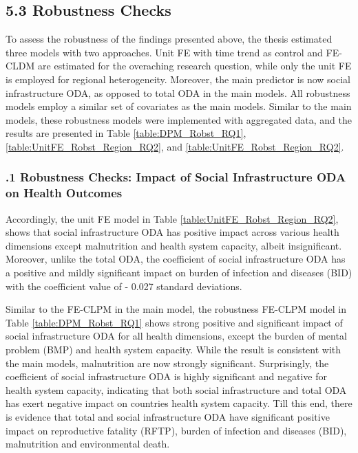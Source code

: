 \subsection*{5.3 Robustness Checks}
To assess the robustness of the findings presented above, the thesis estimated three models with two approaches. Unit FE with time trend as control and FE-CLDM are estimated for the overaching research question, while only the unit FE is employed for regional heterogeneity. Moreover, the main predictor is now social infrastructure ODA, as opposed to total ODA in the main models. All robustness models employ a similar set of covariates as the main models. Similar to the main models, these robustness models were implemented with aggregated data, and the results are presented in Table \ref{table:DPM_Robst_RQ1}, \ref{table:UnitFE_Robst_Region_RQ2}, and \ref{table:UnitFE_Robst_Region_RQ2}.
\subsubsection*{.1 Robustness Checks: Impact of Social Infrastructure ODA on Health Outcomes}


Accordingly, the unit FE model in Table \ref{table:UnitFE_Robst_Region_RQ2}, shows that social infrastructure ODA has positive impact across various health dimensions except malnutrition and health system capacity, albeit insignificant. Moreover, unlike the total ODA, the coefficient of social infrastructure ODA has a positive and mildly significant impact on burden of infection and diseases (BID) with the coefficient value of - 0.027 standard deviations. 


Similar to the FE-CLPM in the main model, the robustness FE-CLPM model  in Table \ref{table:DPM_Robst_RQ1} shows strong positive and significant impact of social infrastructure ODA for all health dimensions, except the burden of mental problem (BMP) and health system capacity. While the result is consistent with the main models, malnutrition are now strongly significant. Surprisingly, the coefficient of social infrastructure ODA is highly significant and negative for health system capacity, indicating that both social infrastructure and total ODA has exert negative impact on countries health system capacity. Till this end, there is evidence that total and social infrastructure ODA have significant positive impact on reproductive fatality (RFTP), burden of infection and diseases (BID), malnutrition and environmental death. 

